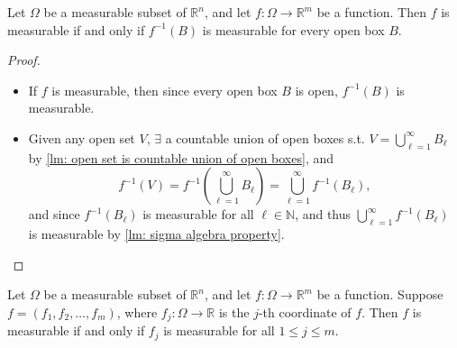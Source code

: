 \begin{lemma} \label{lm: f measurable iff preimage of open box measurable}
    Let \(\Omega \) be a measurable subset of \(\mathbb{R} ^n\), and let \(f: \Omega \to \mathbb{R} ^m\) be a function. Then \(f\) is measurable if and only if \(f^{-1}(B)\) is measurable for every open box \(B\).      
\end{lemma}
\begin{proof}
    \hfill 
    \begin{itemize}
        \item [\((\implies)\)] If \(f\) is measurable, then since every open box \(B\) is open, \(f^{-1}(B)\) is measurable.
        \item [\((\impliedby )\)] Given any open set \(V\), \(\exists \) a countable union of open boxes s.t. \(V = \bigcup_{\ell=1}^{\infty} B_{\ell} \) by \autoref{lm: open set is countable union of open boxes}, and 
        \[
            f^{-1} (V) = f^{-1} \left( \bigcup_{\ell=1}^{\infty} B_{\ell} \right) = \bigcup_{\ell=1}^{\infty} f^{-1}(B_{\ell}),  
        \]
        and since \(f^{-1}(B_{\ell})\) is measurable for all \(\ell \in \mathbb{N}\), and thus \(\bigcup_{\ell=1}^{\infty} f^{-1}(B_{\ell})\) is measurable by \autoref{lm: sigma algebra property}.  
    \end{itemize}
\end{proof}

\begin{corollary} \label{cl: f measurable iff f_j measurable for all j}
    Let \(\Omega\) be a measurable subset of \(\mathbb{R} ^n\), and let \(f: \Omega \to \mathbb{R} ^m\) be a function. Suppose \(f = (f_1, f_2, \dots , f_m)\), where \(f_j : \Omega \to \mathbb{R}\) is the \(j\)-th coordinate of \(f\). Then \(f\) is measurable if and only if \(f_j\) is measurable for all \(1 \le j \le m\).           
\end{corollary}

